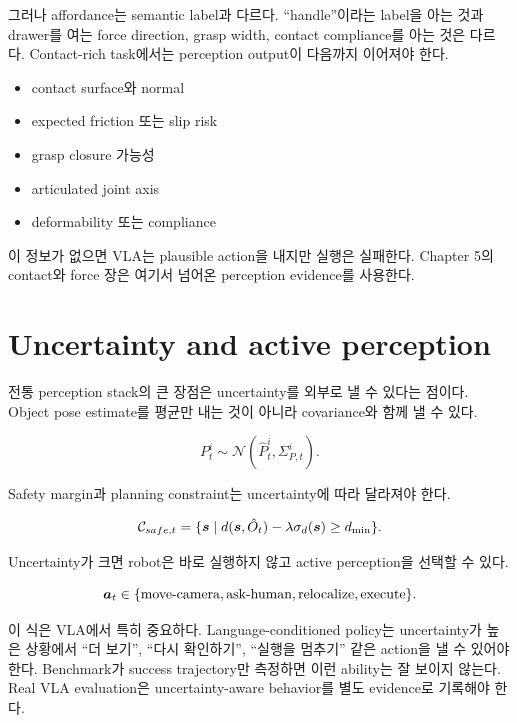 그러나 affordance는 semantic label과 다르다. ``handle''이라는 label을 아는 것과 drawer를 여는 force direction, grasp width, contact compliance를 아는 것은 다르다. Contact-rich task에서는 perception output이 다음까지 이어져야 한다.

\begin{itemize}
  \item contact surface와 normal
  \item expected friction 또는 slip risk
  \item grasp closure 가능성
  \item articulated joint axis
  \item deformability 또는 compliance
\end{itemize}

이 정보가 없으면 VLA는 plausible action을 내지만 실행은 실패한다. Chapter 5의 contact와 force 장은 여기서 넘어온 perception evidence를 사용한다.

\section{Uncertainty and active perception}

전통 perception stack의 큰 장점은 uncertainty를 외부로 낼 수 있다는 점이다. Object pose estimate를 평균만 내는 것이 아니라 covariance와 함께 낼 수 있다.

\begin{equation}
  P_t^i \sim \mathcal{N}(\hat{P}_t^i, \Sigma_{P,t}^i).
  \label{eq:pose-uncertainty}
\end{equation}

Safety margin과 planning constraint는 uncertainty에 따라 달라져야 한다.

\begin{equation}
  \mathcal{C}_{safe,t}
  =
  \{\bm{s}\mid
  d(\bm{s},\hat{O}_t) - \lambda \sigma_d(\bm{s}) \ge d_{\min}
  \}.
  \label{eq:perception-safety-constraint}
\end{equation}

Uncertainty가 크면 robot은 바로 실행하지 않고 active perception을 선택할 수 있다.

\begin{equation}
  \bm{a}_t \in
  \{\text{move-camera},\text{ask-human},\text{relocalize},\text{execute}\}.
  \label{eq:active-perception-action}
\end{equation}

이 식은 VLA에서 특히 중요하다. Language-conditioned policy는 uncertainty가 높은 상황에서 ``더 보기'', ``다시 확인하기'', ``실행을 멈추기'' 같은 action을 낼 수 있어야 한다. Benchmark가 success trajectory만 측정하면 이런 ability는 잘 보이지 않는다. Real VLA evaluation은 uncertainty-aware behavior를 별도 evidence로 기록해야 한다.

